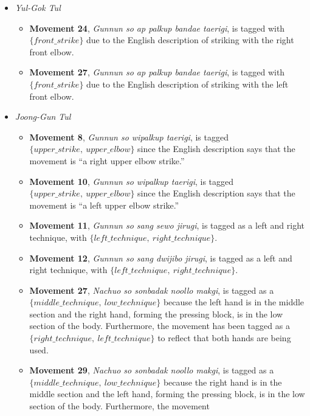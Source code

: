 \documentclass[10pt,twocolumn,a4paper]{article}
\begin{document}
\begin{itemize}
  \item
    \emph{Yul-Gok Tul}
    \begin{itemize}
      \item
        {\bf Movement 24}, \emph{Gunnun so ap palkup bandae taerigi}, is
        tagged with $\{front\_strike\}$ due to the English description of
        striking with the right front elbow.
      \item
        {\bf Movement 27}, \emph{Gunnun so ap palkup bandae taerigi}, is
        tagged with $\{front\_strike\}$ due to the English description of
        striking with the left front elbow.
    \end{itemize}
  \item
    \emph{Joong-Gun Tul}
    \begin{itemize}
      \item
        {\bf Movement 8}, \emph{Gunnun so wipalkup taerigi}, is tagged
        $\{upper\_strike, \: upper\_elbow\}$ since the English description
        says that the movement is ``a right upper elbow strike.''
      \item
        {\bf Movement 10}, \emph{Gunnun so wipalkup taerigi}, is tagged
        $\{upper\_strike, \: upper\_elbow\}$ since the English description
        says that the movement is ``a left upper elbow strike.''
      \item
        {\bf Movement 11}, \emph{Gunnun so sang sewo jirugi}, is tagged as a
        left and right technique, with $\{left\_technique, \:
        right\_technique\}$.
      \item
        {\bf Movement 12}, \emph{Gunnun so sang dwijibo jirugi}, is tagged as
        a left and right technique, with $\{left\_technique, \:
        right\_technique\}$.
      \item
        {\bf Movement 27}, \emph{Nachuo so sonbadak noollo makgi}, is tagged
        as a $\{middle\_technique, \: low\_technique\}$ because the left hand
        is in the middle section and the right hand, forming the pressing
        block, is in the low section of the body. Furthermore, the movement
        has been tagged as a $\{right\_technique, \: left\_technique\}$ to
        reflect that both hands are being used.
      \item
        {\bf Movement 29}, \emph{Nachuo so sonbadak noollo makgi}, is tagged
        as a $\{middle\_technique, \: low\_technique\}$ because the right hand
        is in the middle section and the left hand, forming the pressing
        block, is in the low section of the body. Furthermore, the movement

\end{itemize}
\end{itemize}
\end{document}
